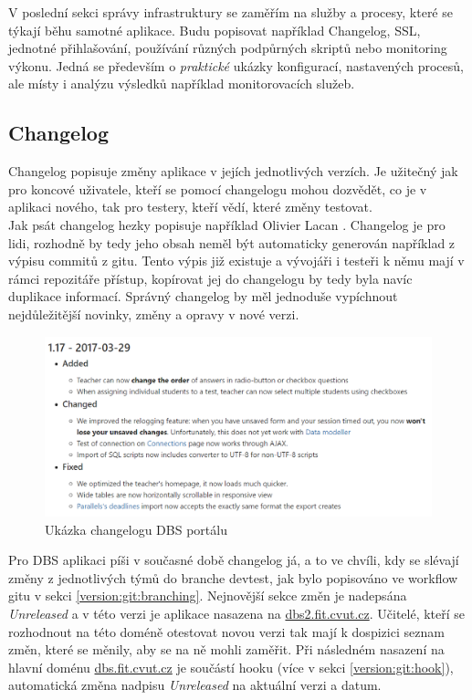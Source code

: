 V poslední sekci správy infrastruktury se zaměřím na služby a procesy, které se týkají běhu samotné aplikace. Budu popisovat například Changelog, SSL, jednotné přihlašování, používání různých podpůrných skriptů nebo monitoring výkonu. Jedná se především o \emph{praktické} ukázky konfigurací, nastavených procesů, ale místy i analýzu výsledků například monitorovacích služeb.

\subsection{Changelog} \label{app:changelog}

Changelog popisuje změny aplikace v jejích jednotlivých verzích. Je užitečný jak pro koncové uživatele, kteří se pomocí changelogu mohou dozvědět, co je v aplikaci nového, tak pro testery, kteří vědí, které změny testovat.\\
Jak psát changelog hezky popisuje například Olivier Lacan \cite{changelog}. Changelog je pro lidi, rozhodně by tedy jeho obsah neměl být automaticky generován například z výpisu commitů z gitu. Tento výpis již existuje a vývojáři i testeři k němu mají v rámci repozitáře přístup, kopírovat jej do changelogu by tedy byla navíc duplikace informací. Správný changelog by měl jednoduše vypíchnout nejdůležitější novinky, změny a opravy v nové verzi.\\
\begin{figure}[H]
\includegraphics[width=\textwidth]{../png/changelog.png}
\caption{Ukázka changelogu DBS portálu} \label{picture:changelog}
\end{figure}
Pro DBS aplikaci píši v současné době changelog já, a to ve chvíli, kdy se slévají změny z jednotlivých týmů do branche devtest, jak bylo popisováno ve workflow gitu v sekci \ref{version:git:branching}. Nejnovější sekce změn je nadepsána \emph{Unreleased} a v této verzi je aplikace nasazena na \url{dbs2.fit.cvut.cz}. Učitelé, kteří se rozhodnout na této doméně otestovat novou verzi tak mají k dospizici seznam změn, které se měnily, aby se na ně mohli zaměřit. Při následném nasazení na hlavní doménu \url{dbs.fit.cvut.cz} je součástí  hooku (více v sekci \ref{version:git:hook}), automatická změna nadpisu \emph{Unreleased} na aktuální verzi a datum.

